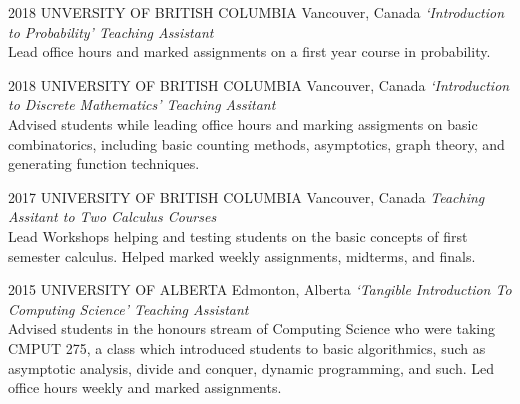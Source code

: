 \documentclass{friggeri-cv}
\begin{document}
\begin{entrylist}

\entry
{2018}
{UNVERSITY OF BRITISH COLUMBIA}
{Vancouver, Canada}
{\emph{`Introduction to Probability' Teaching Assistant} \\
Lead office hours and marked assignments on a first year course in probability.
}

\entry
{2018}
{UNIVERSITY OF BRITISH COLUMBIA}
{Vancouver, Canada}
{\emph{`Introduction to Discrete Mathematics' Teaching Assitant} \\
Advised students while leading office hours and marking assigments on basic combinatorics, including basic counting methods, asymptotics, graph theory, and generating function techniques.}

\entry
{2017}
{UNIVERSITY OF BRITISH COLUMBIA}
{Vancouver, Canada}
{\emph{Teaching Assitant to Two Calculus Courses} \\
Lead Workshops helping and testing students on the basic concepts of first semester calculus. Helped marked weekly assignments, midterms, and finals.
}

\entry
{2015}
{UNIVERSITY OF ALBERTA}
{Edmonton, Alberta}
{\emph{`Tangible Introduction To Computing Science' Teaching Assistant} \\
Advised students in the honours stream of Computing Science who were taking CMPUT 275, a class which introduced students to basic algorithmics, such as asymptotic analysis, divide and conquer, dynamic programming, and such. Led office hours weekly and marked assignments.}

\end{entrylist}





\end{document}
